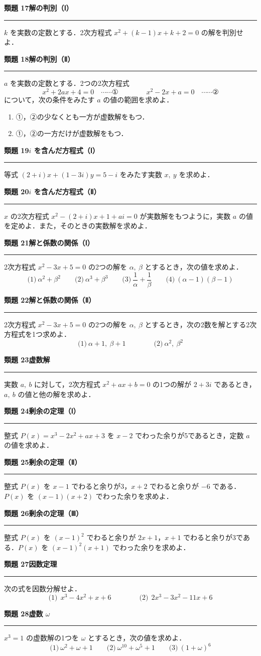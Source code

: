 \documentclass[a4paper,11pt]{ltjsarticle}
\newcommand{\mon}[2]{\Needspace{7\baselineskip}\vspace{10pt}%
  {\sffamily\bfseries 類題 #1\quad #2\par}\vspace{2pt}\hrule\vspace{4pt}}
\begin{document}
\mon{17}{解の判別（Ⅰ）}
$k$ を実数の定数とする．2次方程式 $x^2+(k-1)x+k+2=0$ の解を判別せよ．

\mon{18}{解の判別（Ⅱ）}
$a$ を実数の定数とする．2つの2次方程式
\[x^2+2ax+4=0\quad\cdots\cdots\text{①}\qquad\qquad x^2-2x+a=0\quad\cdots\cdots\text{②}\]
について，次の条件をみたす $a$ の値の範囲を求めよ．
\begin{enumerate}
\item ①，②の少なくとも一方が虚数解をもつ．
\item ①，②の一方だけが虚数解をもつ．
\end{enumerate}

\mon{19}{$i$ を含んだ方程式（Ⅰ）}
等式 $(2+i)x+(1-3i)y=5-i$ をみたす実数 $x,\ y$ を求めよ．

\mon{20}{$i$ を含んだ方程式（Ⅱ）}
$x$ の2次方程式 $x^2-(2+i)x+1+ai=0$ が実数解をもつように，実数 $a$ の値を定めよ．また，そのときの実数解を求めよ．

\mon{21}{解と係数の関係（Ⅰ）}
2次方程式 $x^2-3x+5=0$ の2つの解を $\alpha,\ \beta$ とするとき，次の値を求めよ．
\[\text{(1)}\ \alpha^2+\beta^2\qquad\text{(2)}\ \alpha^3+\beta^3\qquad\text{(3)}\ \frac1\alpha+\frac1\beta\qquad\text{(4)}\ (\alpha-1)(\beta-1)\]

\mon{22}{解と係数の関係（Ⅱ）}
2次方程式 $x^2-3x+5=0$ の2つの解を $\alpha,\ \beta$ とするとき，次の2数を解とする2次方程式を1つ求めよ．
\[\text{(1)}\ \alpha+1,\ \beta+1\qquad\qquad\text{(2)}\ \alpha^2,\ \beta^2\]

\mon{23}{虚数解}
実数 $a,\ b$ に対して，2次方程式 $x^2+ax+b=0$ の1つの解が $2+3i$ であるとき，$a,\ b$ の値と他の解を求めよ．

\mon{24}{剰余の定理（Ⅰ）}
整式 $P(x)=x^3-2x^2+ax+3$ を $x-2$ でわった余りが5であるとき，定数 $a$ の値を求めよ．

\mon{25}{剰余の定理（Ⅱ）}
整式 $P(x)$ を $x-1$ でわると余りが3，$x+2$ でわると余りが $-6$ である．$P(x)$ を $(x-1)(x+2)$ でわった余りを求めよ．

\mon{26}{剰余の定理（Ⅲ）}
整式 $P(x)$ を $(x-1)^2$ でわると余りが $2x+1$，$x+1$ でわると余りが3である．$P(x)$ を $(x-1)^2(x+1)$ でわった余りを求めよ．

\mon{27}{因数定理}
次の式を因数分解せよ．
\[\text{(1)}\ \ x^3-4x^2+x+6\qquad\qquad\text{(2)}\ \ 2x^3-3x^2-11x+6\]

\mon{28}{虚数 $\omega$}
$x^3=1$ の虚数解の1つを $\omega$ とするとき，次の値を求めよ．
\[\text{(1)}\ \omega^2+\omega+1\qquad\text{(2)}\ \omega^{10}+\omega^5+1\qquad\text{(3)}\ (1+\omega)^6\]
\end{document}
